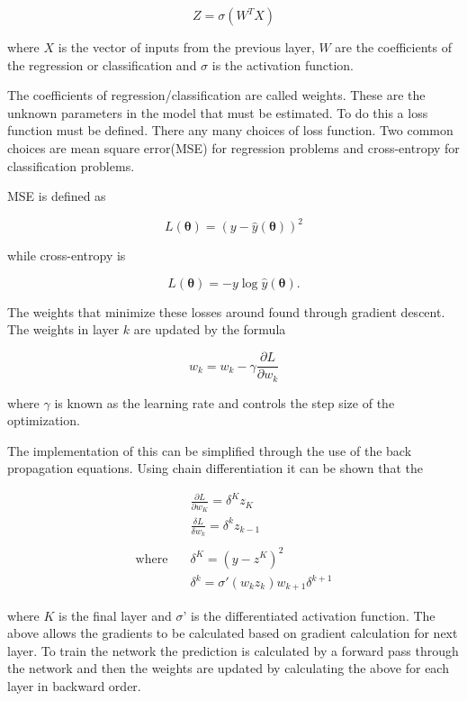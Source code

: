 \begin{equation}
    Z = \sigma(W^TX)
\end{equation}

where $X$ is the vector of inputs from the previous layer, $W$ are the coefficients of the regression or classification and $\sigma$ is the activation function.

The coefficients of regression/classification are called weights. These are the unknown parameters in the model that must be estimated. To do this a loss function must be defined. There any many choices of loss function. Two common choices are mean square error(MSE) for regression problems and cross-entropy for classification problems. 

MSE is defined as 

\begin{equation}
 L(\bm{\theta}) = (y - \hat{y}(\bm{\theta}))^2
\end{equation}

while cross-entropy is

\begin{equation}
 L(\bm{\theta}) = -y \log \hat{y}(\bm{\theta}).
\end{equation}

The weights that minimize these losses around found through gradient descent. The weights in layer $k$ are updated by the formula

\begin{equation}
 w_k = w_k - \gamma \frac{\partial{L}}{\partial{w_k}}
\end{equation}

where $\gamma$ is known as the learning rate and controls the step size of the optimization.

The implementation of this can be simplified through the use of the back propagation equations. Using chain differentiation it can be shown that the 

\begin{align}
    &\frac{\partial{L}}{\partial{w_K}} = \delta^K z_K \\
    &\frac{\delta{L}}{\delta{w_k}} = \delta^k z_{k-1}\\
    & \ \\
    \text{where} \quad &\delta^K = (y - z^K)^2 \\
    & \delta^k = \sigma'(w_k z_k) w_{k+1}\delta^{k+1}
\end{align}

where $K$ is the final layer and $\sigma$' is the differentiated activation function. The above allows the gradients to be calculated based on gradient calculation for next layer. To train the network the prediction is calculated by a forward pass through the network and then the weights are updated by calculating the above for each layer in backward order. \citep[p.~ 392-396]{hastie_2009}

